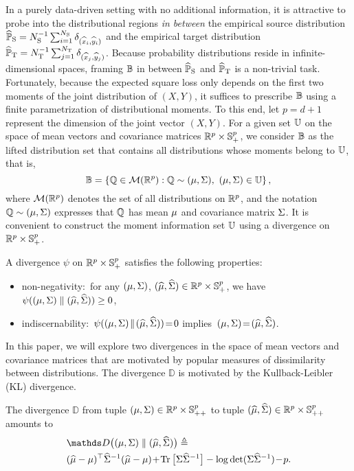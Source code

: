 \documentclass{article}
\begin{document}
In a purely data-driven setting with no additional information, it is attractive to probe into the distributional regions \textit{in between} the empirical source distribution ${\widehat{\mathbb P}_{\rm S} = N_{\rm S}^{-1} \sum_{i=1}^{N_{\rm S}} \delta_{(\widehat x_i, \widehat y_i)}}$ and the empirical target distribution $\widehat{\mathbb P}_{\rm T} = N_{\rm T}^{-1} \sum_{j=1}^{N_{\rm T}} \delta_{(\widehat x_j, \widehat y_j)}$. Because probability distributions reside in infinite-dimensional spaces, framing $\mathbb B$ in between $\widehat{\mathbb P}_{\rm S}$ and $\widehat{\mathbb P}_{\rm T}$ is a non-trivial task. Fortunately, because the expected square loss only depends on the first two moments of the joint distribution of $(X, Y)$, it suffices to prescribe $\mathbb B$ using a finite parametrization of distributional moments. To this end, let $p = d+1$ represent the dimension of the joint vector $(X, Y)$. For a given set $\mathbb U$ on the space of mean vectors and covariance matrices $\mathbb{R}^{p} \times \mathbb{S}_{+}^{p}$, we consider $\mathbb B$ as the lifted distribution set that contains all distributions whose moments belong to $\mathbb U$, that is,
\[
    \mathbb B =
\left\{
	\mathbb Q \in \mathcal M(\mathbb{R}^{p}): \mathbb Q \sim (\mu, \Sigma),~ (\mu, \Sigma) \in \mathbb U
\right\},
\]
where $\mathcal M(\mathbb{R}^p)$ denotes the set of all distributions on $\mathbb{R}^p$, and the notation $\mathbb Q \sim (\mu, \Sigma)$ expresses that $\mathbb Q$ has mean $\mu$ and covariance matrix $\Sigma$. It is convenient to construct the moment information set $\mathbb U$ using a divergence on $\mathbb{R}^p \times \mathbb{S}_{+}^p$.

\begin{definition}[Divergence] \label{def:divergence}
    A divergence $\psi$ on $\mathbb{R}^p \times \mathbb{S}_{+}^p$ satisfies the following properties:
    \begin{itemize}[leftmargin = 3mm, itemsep=0.5mm]
\vspace{-.3cm}
        \item non-negativity:~for any $(\mu, \Sigma)$, $(\widehat {\mu}, \widehat{\Sigma}) \in \mathbb{R}^p \times \mathbb{S}_{+}^p$, we have $\psi((\mu, \Sigma) \parallel (\widehat {\mu}, \widehat{\Sigma}) ) \ge 0$,
        \item indiscernability:~$\psi((\mu, \Sigma)\!\parallel\!(\widehat {\mu}, \widehat{\Sigma}))\!=\!0$ implies~$(\mu, \Sigma)\!=\!(\widehat {\mu}, \widehat{\Sigma})$.
    \end{itemize}
\end{definition}

In this paper, we will explore two divergences in the space of mean vectors and covariance matrices that are motivated by popular measures of dissimilarity between distributions.
The divergence $\mathds D$ is motivated by the Kullback-Leibler (KL) divergence.
\begin{definition} \label{def:KL}
    The divergence $\mathds D$ from tuple $(\mu, \Sigma) \in \mathbb{R}^p \times \mathbb{S}_{++}^p$ to tuple $(\widehat {\mu}, \widehat{\Sigma}) \in \mathbb{R}^p \times \mathbb{S}_{++}^p$ amounts to 
    \begin{align*}
        &{\mathds D} \big( (\m, \cov) \parallel (\msa, \covsa) \big) \Let \\
        &(\msa - \m)^\top\covsa^{-1} (\msa - \m)\! + \! \Tr{\cov \covsa^{-1}} - \log\det (\cov \covsa^{-1}) \!-\! p.
    \end{align*}
\end{definition}
\end{document}
